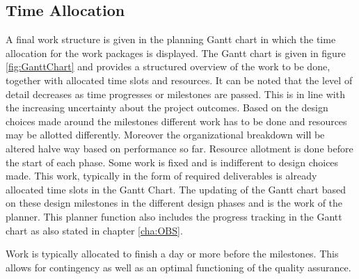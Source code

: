 \subsection{Time Allocation}\label{sec:timeallocation}

A final work structure is given in the planning Gantt chart in which the time allocation for the work packages is displayed. The Gantt chart is given in figure \ref{fig:GanttChart} and provides a structured overview of the work to be done, together with allocated time slots and resources. It can be noted that the level of detail decreases as time progresses or milestones are passed. This is in line with the increasing uncertainty about the project outcomes. Based on the design choices made around the milestones different work has to be done and resources may be allotted differently. Moreover the organizational breakdown will be altered halve way based on performance so far. Resource allotment is done before the start of each phase. Some work is fixed and is indifferent to design choices made. This work, typically in the form of required deliverables is already allocated time slots in the Gantt Chart. The updating of the Gantt chart based on these design milestones in the different design phases and is the work of the planner. This planner function also includes the progress tracking in the Gantt chart as also stated in chapter \ref{cha:OBS}.

Work is typically allocated to finish a day or more before the milestones. This allows for contingency as well as an optimal functioning of the quality assurance.



